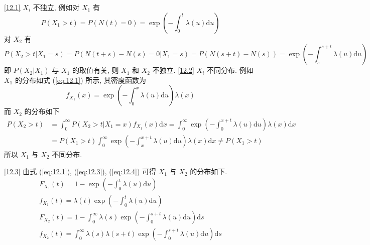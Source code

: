 \documentclass[boxes]{homework}
\begin{document}
\begin{solution}
    \ref{12.1} $X_i$ 不独立, 例如对 $X_1$ 有
    \begin{equation}\label{eq:12.1}
        P(X_1>t)=P(N(t)=0) = \exp\left(-\int_0^t\lambda(u)\mathrm{d}u\right)
    \end{equation}
    对 $X_2$ 有
    \begin{equation}
        P(X_2>t\vert X_1 = s) = P(N(t+s)-N(s) = 0\vert X_1 = s) = P(N(s+t)-N(s))=\exp\left(-\int_s^{s+t}\lambda(u)\mathrm{d}u\right)
    \end{equation}
    即 $P(X_2|X_1)$ 与 $X_1$ 的取值有关, 则 $X_1$ 和 $X_2$ 不独立.
    \newpage
    \ref{12.2} $X_i$ 不同分布. 例如 $X_1$ 的分布如式 (\ref{eq:12.1}) 所示, 其密度函数为
    \begin{equation}\label{eq:12.3}
        f_{X_1}(x) = \exp\left(-\int_0^x\lambda(u)\mathrm{d}u\right)\lambda(x)
    \end{equation}
    而 $X_2$ 的分布如下
    \begin{equation}\label{eq:12.4}
        \begin{aligned}
            P(X_2>t) &= \int_0^\infty P(X_2>t\vert X_1=x)f_{X_1}(x)\mathrm{d}x=\int_0^\infty\exp\left(-\int_0^{x+t}\lambda(u)\mathrm{d}u\right)\lambda(x)\mathrm{d}x\\
            &= P(X_1>t)\int_0^\infty\exp\left(-\int_x^{x+t}\lambda(u)\mathrm{d}u\right)\lambda(x)\mathrm{d}x\neq P(X_1>t)
        \end{aligned}
    \end{equation}
    所以 $X_1$ 与 $X_2$ 不同分布.

    \ref{12.3} 由式 (\ref{eq:12.1}), (\ref{eq:12.3}), (\ref{eq:12.4}) 可得 $X_1$ 与 $X_2$ 的分布如下.
    \begin{gather}
        F_{X_1}(t) = 1-\exp\left(-\int_0^t\lambda(u)\mathrm{d}u\right)\\
        f_{X_1}(t) = \lambda(t)\exp\left(-\int_0^t\lambda(u)\mathrm{d}u\right)\\
        F_{X_2}(t) = 1-\int_0^\infty\lambda(s)\exp\left(-\int_0^{s+t}\lambda(u)\mathrm{d}u\right)\mathrm{d}s\\
        f_{X_2}(t) = \int_0^\infty\lambda(s)\lambda(s+t)\exp\left(-\int_0^{s+t}\lambda(u)\mathrm{d}u\right)\mathrm{d}s
    \end{gather}
\end{solution}
\end{document}
